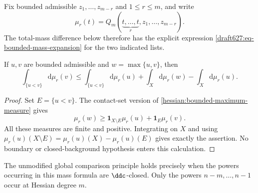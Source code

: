 Fix bounded admissible $z_1,\ldots,z_{m-r}$ and $1\leq r\leq m$,
and write
\[
 \mu_r(t)=Q_m(\underbrace{t,\ldots,t}_{r},z_1,\ldots,z_{m-r}).
\]
The total-mass difference below therefore has the explicit expression
\eqref{draft627:eq-bounded-mass-expansion} for the two indicated lists.

\begin{proposition}\label{draft627:comparison-mass-defect}
If $u,v$ are bounded admissible and $w=\max\{u,v\}$, then
\[
 \int_{\{u<v\}}\mathrm d\mu_r(v)
 \leq\int_{\{u<v\}}\mathrm d\mu_r(u)
                +\int_X\mathrm d\mu_r(w)-\int_X\mathrm d\mu_r(u).
\]
\end{proposition}
\begin{proof}
Set $E=\{u<v\}$. The contact-set version of
\cref{hessian:bounded-maximum-measure} gives
\[
 \mu_r(w)\geq\mathbf1_{X\setminus E}\mu_r(u)
                     +\mathbf1_E\mu_r(v).
\]
All these measures are finite and positive. Integrating on $X$ and
using $\mu_r(u)(X\setminus E)=\mu_r(u)(X)-\mu_r(u)(E)$ gives
exactly the assertion. No boundary or closed-background hypothesis
enters this calculation.
\end{proof}

The unmodified global comparison principle holds precisely when the
powers occurring in this mass formula are $\ddc$-closed. Only the
powers $n-m,\ldots,n-1$ occur at Hessian degree $m$.

